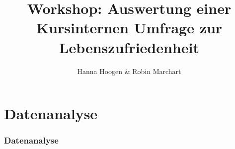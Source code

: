 \documentclass[aspectratio=169]{beamer}
\title{Workshop: Auswertung einer Kursinternen Umfrage zur Lebenszufriedenheit}
\author{Hanna Hoogen \& Robin Marchart}
\institute{TUM Kolleg Wissenschaftstag}
\begin{document}
 
    \begin{frame}
        
    \end{frame}
    \maketitle
    \section{Datenanalyse}
    \begin{frame}
        \frametitle{Datenanalyse}
        \transfade%
        
    
    \end{frame}
\end{document}
